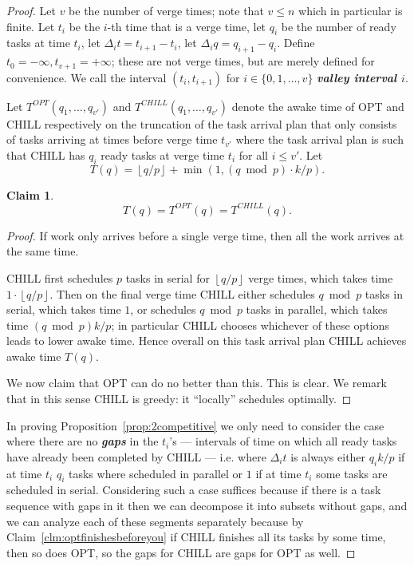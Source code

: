 \documentclass[twocolumn]{article}[11pt]
\newcommand{\defn}[1]{{\textit{\textbf{\boldmath #1}}}\xspace}
\newcommand{\floor}[1]{\left\lfloor #1 \right\rfloor}
\newtheorem{clm}{Claim}
\begin{document}
\begin{proof}
  Let $v$ be the number of verge times; note that $v\le n$ which
  in particular is finite. Let $t_i$ be the $i$-th time that is a
  verge time, let $q_i$ be the number of ready tasks at time
  $t_i$, let $\Delta_i t = t_{i+1} - t_i$, let $\Delta_i q =
  q_{i+1} - q_i$. Define $t_0 = -\infty, t_{v+1} = +\infty$; 
  these are not verge times, but are merely defined for convenience.
  We call the interval $(t_i, t_{i+1})$ for $i\in \{0,1,\ldots,
  v\}$ \defn{valley interval $i$}. 

  Let $T^{OPT}(q_1, \ldots, q_{v'})$ and $T^{CHILL}(q_1, \ldots,
  q_{v'})$ denote the awake time of OPT and CHILL respectively on
  the truncation of the task arrival plan that only consists of
  tasks arriving at times before verge time $t_{v'}$ where the
  task arrival plan is such that CHILL has $q_i$ ready tasks at verge
  time $t_i$ for all $i \le v'$. Let 
  $$ T(q) = \floor{q/p} + \min(1, (q\bmod p)\cdot k/p). $$

  \begin{clm}
    $$T(q) = T^{OPT}(q) = T^{CHILL}(q).$$
  \end{clm}
  \begin{proof}
    If work only arrives before a single verge time, then all the
    work arrives at the same time. 

    CHILL first schedules $p$ tasks in serial for $\floor{q/p}$
    verge times, which takes time $1\cdot \floor{q/p}$. Then on
    the final verge time CHILL either schedules $q\bmod p$ tasks
    in serial, which takes time $1$, or schedules $q\bmod p$
    tasks in parallel, which takes time $(q\bmod p)k/p$; in
    particular CHILL chooses whichever of these options leads to
    lower awake time. Hence overall on this task arrival plan
    CHILL achieves awake time $T(q)$.

    We now claim that OPT can do no better than this. This is clear.
    We remark that in this sense CHILL is greedy: it
    \enquote{locally} schedules optimally. 

  \end{proof}


  In proving Proposition~\ref{prop:2competitive} we only need to
  consider the case where there are no \defn{gaps}
  in the $t_i$'s --- intervals of time on which all ready tasks
  have already been completed  by CHILL --- i.e. where $\Delta_i t$ is always
  either $q_i k/p$ if at time $t_i$ $q_i$ tasks where scheduled in
  parallel or $1$ if at time $t_i$ some tasks are scheduled in
  serial. Considering such a case suffices because if there is a
  task sequence with gaps in it then we can decompose it into
  subsets without gaps, and we can analyze each of these segments
  separately because by Claim~\ref{clm:optfinishesbeforeyou} if
  CHILL finishes all its tasks by some time, then so does OPT, so
  the gaps for CHILL are gaps for OPT as well. 


\end{proof}
\end{document}
